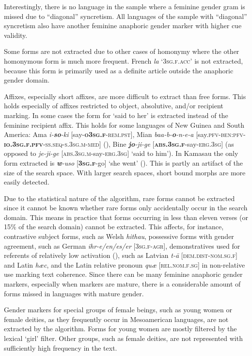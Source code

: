 \documentclass[output=collectionpaper]{langsci/langscibook}
\begin{document}
Interestingly, there is no language in the sample where a feminine gender gram is missed due to “diagonal” syncretism. All languages of the sample with “diagonal” syncretism also have another feminine anaphoric gender marker with higher cue validity.

Some forms are not extracted due to other cases of homonymy where the other homonymous form is much more frequent. French \textit{la} ‘\textsc{3sg.f.acc}’ is not extracted, because this form is primarily used as a definite article outside the anaphoric gender domain.

Affixes, especially short affixes, are more difficult to extract than free forms. This holds especially of affixes restricted to object, absolutive, and/or recipient marking. In some cases the form for ‘said to her’ is extracted instead of the feminine recipient affix. This holds for some languages of New Guinea and South America: Ama \textit{i-\textbf{so}-ki} [say-\textsc{\textbf{o3sg.f}-rem.pst}], Mian \textit{baa-b-\textbf{o}-n-e-a} [say.\textsc{pfv-ben:pfv-\textbf{io.3sg.f.pfv}-ss.seq-s.3sg.m-med}] (\citealt{Fedden2007}), Bine \textit{\textbf{jo}-ji-ge} [\textsc{\textbf{abs.3sg.f}}-say-\textsc{erg.3sg}] (as opposed to \textit{je-ji-ge} [\textsc{abs.3sg.m}-say-\textsc{erg.3sg}] ‘said to him’). In Kamasau the only form extracted is \textit{\textbf{w}-uso} [\textsc{\textbf{3sg.f}}-go] ‘she went’ (\citealt[21]{Sanders1994}). This is partly an artifact of the size of the search space. With larger search spaces, short bound morphs are more easily detected.

Due to the statistical nature of the algorithm, rare forms cannot be extracted since it cannot be known whether rare forms only accidentally occur in the search domain. This means in practice that forms occurring in less than eleven verses (or 15\% of the search domain) cannot be extracted. This affects, for instance, contrastive subject forms, such as Welsh \textit{hithau}, possessive forms with gender agreement, such as German \textit{ihr-e/en/es/er} [\textsc{3sg.f-agr}], demonstratives used for referents of relatively low activation (\citealt[327]{Kibrik2011}), such as Latvian \textit{t-ā} [\textsc{dem.dist-nom.sg.f}] and Latin \textit{hæc}, and the Latin relative pronoun \textit{quæ} [\textsc{rel.nom.f.sg}] in non-relative use marking text coherence. Since there can be many feminine anaphoric gender markers, especially when markers are mature, there is a considerable amount of forms missed in languages with mature gender.

Gender markers for special groups of female beings, such as young women or female deities, as they frequently occur in Mesoamerican languages, are not extracted by the algorithm. Forms for young women are mostly filtered by the lexical ‘girl’ filter. Other groups, such as female deities, are not represented with sufficiently high frequency in the text.
\end{document}

